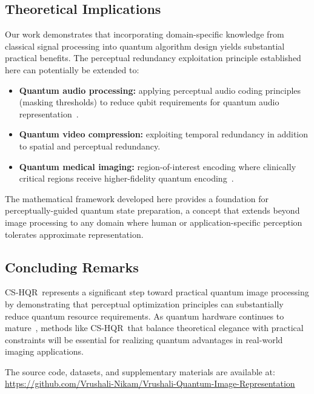 \documentclass{ipol}
\newcommand{\cshqr}{\textsc{CS-HQR}}
\begin{document}
\FloatBarrier
\subsection{Theoretical Implications}

Our work demonstrates that incorporating domain-specific knowledge from
classical signal processing into quantum algorithm design yields substantial
practical benefits. The perceptual redundancy exploitation principle
established here can potentially be extended to:
\begin{itemize}
  \item \textbf{Quantum audio processing:} applying perceptual audio coding
    principles (masking thresholds) to reduce qubit requirements for quantum
    audio representation~\cite{ref56,ref58}.
  \item \textbf{Quantum video compression:} exploiting temporal redundancy
    in addition to spatial and perceptual redundancy.
  \item \textbf{Quantum medical imaging:} region-of-interest encoding where
    clinically critical regions receive higher-fidelity quantum encoding~\cite{ref62,ref65,ref68}.
\end{itemize}

The mathematical framework developed here provides a foundation for
perceptually-guided quantum state preparation, a concept that extends beyond
image processing to any domain where human or application-specific perception
tolerates approximate representation.

\FloatBarrier
\subsection{Concluding Remarks}

\cshqr\ represents a significant step toward practical quantum image
processing by demonstrating that perceptual optimization principles can
substantially reduce quantum resource requirements. As quantum hardware
continues to mature~\cite{ref70}, methods like \cshqr\ that balance theoretical elegance
with practical constraints will be essential for realizing quantum advantages
in real-world imaging applications.

The source code, datasets, and supplementary materials are available at:\\
\url{https://github.com/Vrushali-Nikam/Vrushali-Quantum-Image-Representation}

\FloatBarrier
\end{document}

